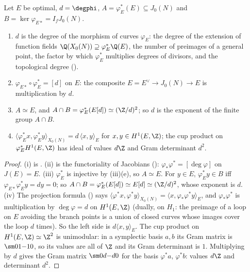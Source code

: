 \begin{proposition}\label{prop:moddeg:degree-descriptions}
Let $E$ be optimal, $d=\degphi$, $A=\varphi_E^*(E)\subseteq J_0(N)$ and $B=\ker\varphi_{E*}=I_fJ_0(N)$.
\begin{enumerate}[label=(\roman*)]
\item $d$ is the degree of the morphism of curves $\varphi_E$: the degree of the extension of function fields $\Q(X_0(N))\supseteq\varphi_E^*\Q(E)$, the number of preimages of a general point, the factor by
which $\varphi_E^*$ multiplies degrees of divisors, and the topological degree ().
\item $\varphi_{E*}\circ\varphi_E^*=[d]$ on $E$: the composite $E=E^\vee\to J_0(N)\to E$ is multiplication by $d$.
\item $A\simeq E$, and $A\cap B=\varphi_E^*(E[d])\simeq(\Z/d)^2$; so $d$ is the exponent of the finite group $A\cap B$.
\item $\langle\varphi_E^*x,\varphi_E^*y\rangle_{X_0(N)}=d\,\langle x,y\rangle_E$ for $x,y\in H^1(E,\Z)$; the cup product on $\varphi_E^*H^1(E,\Z)$ has ideal of values $d\Z$ and Gram determinant $d^2$.
\end{enumerate}
\end{proposition}

\begin{proof}
(i) is . (ii) is the functoriality of Jacobians (): $\varphi_*\varphi^*=[\deg\varphi]$ on $J(E)=E$. (iii) $\varphi_E^*$ is injective by
(iii)(e), so $A\simeq E$. For $y\in E$, $\varphi_E^*y\in B$ iff $\varphi_{E*}\varphi_E^*y=dy=0$; so $A\cap B=\varphi_E^*(E[d])\simeq E[d]\simeq(\Z/d)^2$, whose exponent is $d$.
(iv) The projection formula () says $\langle\varphi^*x,\varphi^*y\rangle_{X_0(N)}=\langle x,\varphi_*\varphi^*y\rangle_E$, and $\varphi_*\varphi^*$ is multiplication by
$\deg\varphi=d$ on $H^1(E,\Z)$ (dually, on $H_1$: the preimage of a loop on $E$ avoiding the branch points is a union of closed curves whose images cover the loop $d$ times). So the left side is $d\langle x,y\rangle_E$. The
cup product on $H^1(E,\Z)\simeq\Z^2$ is unimodular: in a symplectic basis $a,b$ its Gram matrix is $\sm01{-1}0$, so its values are all of $\Z$ and its Gram determinant is $1$. Multiplying by $d$
gives the Gram matrix $\sm0d{-d}0$ for the basis $\varphi^*a$, $\varphi^*b$: values $d\Z$ and determinant $d^2$.
\end{proof}

